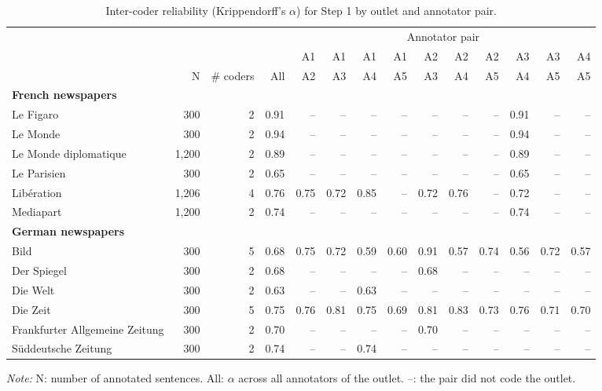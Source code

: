 \begin{table}[htbp]
\centering
\scriptsize
\setlength{\tabcolsep}{3.5pt}
\begin{threeparttable}
\caption{Inter-coder reliability (Krippendorff's $\alpha$) for Step 1 by outlet and annotator pair.}
\label{tab:icr_step1_outlet_by_pair}
\begin{tabular}{l r r r r r r r r r r r r r }
\toprule
 & & & & \multicolumn{10}{c}{Annotator pair} \\
\cmidrule(lr){5-14}
 &  &  &  & A1 & A1 & A1 & A1 & A2 & A2 & A2 & A3 & A3 & A4 \\
 & N & \# coders & All & A2 & A3 & A4 & A5 & A3 & A4 & A5 & A4 & A5 & A5 \\
\midrule
\multicolumn{14}{l}{\textbf{French newspapers}} \\
\quad Le Figaro & 300 & 2 & 0.91 & -- & -- & -- & -- & -- & -- & -- & 0.91 & -- & -- \\
\quad Le Monde & 300 & 2 & 0.94 & -- & -- & -- & -- & -- & -- & -- & 0.94 & -- & -- \\
\quad Le Monde diplomatique & 1,200 & 2 & 0.89 & -- & -- & -- & -- & -- & -- & -- & 0.89 & -- & -- \\
\quad Le Parisien & 300 & 2 & 0.65 & -- & -- & -- & -- & -- & -- & -- & 0.65 & -- & -- \\
\quad Libération & 1,206 & 4 & 0.76 & 0.75 & 0.72 & 0.85 & -- & 0.72 & 0.76 & -- & 0.72 & -- & -- \\
\quad Mediapart & 1,200 & 2 & 0.74 & -- & -- & -- & -- & -- & -- & -- & 0.74 & -- & -- \\
\midrule
\multicolumn{14}{l}{\textbf{German newspapers}} \\
\quad Bild & 300 & 5 & 0.68 & 0.75 & 0.72 & 0.59 & 0.60 & 0.91 & 0.57 & 0.74 & 0.56 & 0.72 & 0.57 \\
\quad Der Spiegel & 300 & 2 & 0.68 & -- & -- & -- & -- & 0.68 & -- & -- & -- & -- & -- \\
\quad Die Welt & 300 & 2 & 0.63 & -- & -- & 0.63 & -- & -- & -- & -- & -- & -- & -- \\
\quad Die Zeit & 300 & 5 & 0.75 & 0.76 & 0.81 & 0.75 & 0.69 & 0.81 & 0.83 & 0.73 & 0.76 & 0.71 & 0.70 \\
\quad Frankfurter Allgemeine Zeitung & 300 & 2 & 0.70 & -- & -- & -- & -- & 0.70 & -- & -- & -- & -- & -- \\
\quad Süddeutsche Zeitung & 300 & 2 & 0.74 & -- & -- & 0.74 & -- & -- & -- & -- & -- & -- & -- \\
\bottomrule
\end{tabular}
\begin{tablenotes}[flushleft]
\footnotesize
\item \textit{Note:} N: number of annotated sentences. All: $\alpha$ across all annotators of the outlet. --: the pair did not code the outlet.
\end{tablenotes}
\end{threeparttable}
\end{table}
